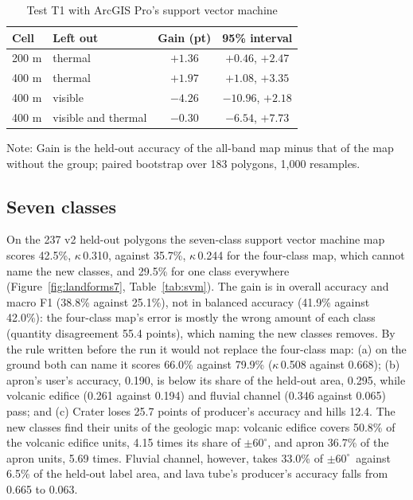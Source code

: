 \documentclass[twocolumn]{aastex701}
\newcommand{\pmsixty}{$\pm60^{\circ}$}
\newcommand{\kap}{$\kappa$}
\begin{document}
\begin{table}[t]
\centering
\caption{Test T1 with ArcGIS Pro's support vector machine \label{tab:t1}}
\small
\begin{tabular}{llcc}
\hline\hline
Cell & Left out & Gain (pt) & 95\% interval \\
\hline
200 m & thermal & $+1.36$ & $+0.46$, $+2.47$ \\
400 m & thermal & $+1.97$ & $+1.08$, $+3.35$ \\
400 m & visible & $-4.26$ & $-10.96$, $+2.18$ \\
400 m & visible and thermal & $-0.30$ & $-6.54$, $+7.73$ \\
\hline
\end{tabular}
\par\vspace{3pt}\noindent\parbox{\columnwidth}{\footnotesize Note: Gain is the held-out accuracy of the all-band map minus that of the map without the group; paired bootstrap over 183 polygons, 1,000 resamples.}
\end{table}

\subsection{Seven classes}

On the 237 v2 held-out polygons the seven-class support vector machine map scores 42.5\%, \kap\,0.310, against
35.7\%, \kap\,0.244 for the four-class map, which cannot name the new classes, and 29.5\% for one class everywhere
(Figure~\ref{fig:landforms7}, Table~\ref{tab:svm}). The gain is in overall accuracy and macro F1 (38.8\% against
25.1\%), not in balanced accuracy (41.9\% against 42.0\%): the four-class map's error is mostly the wrong amount of each
class (quantity disagreement 55.4 points), which naming the new classes removes. %
By the rule written before the run it would not replace the
four-class map: (a) on the ground both can name it scores 66.0\% against 79.9\% (\kap\,0.508 against 0.668); (b)
apron's user's accuracy, 0.190, is below its share of the held-out area, 0.295, while volcanic edifice (0.261 against
0.194) and fluvial channel (0.346 against 0.065) pass; and (c) Crater loses 25.7 points of producer's accuracy and
hills 12.4. The new classes find their units of the geologic map: volcanic edifice covers 50.8\% of the volcanic
edifice units, 4.15 times its share of \pmsixty, and apron 36.7\% of the apron units, 5.69 times. Fluvial channel,
however, takes 33.0\% of \pmsixty\ against 6.5\% of the held-out label area, and lava tube's producer's accuracy
falls from 0.665 to 0.063. %
\end{document}
